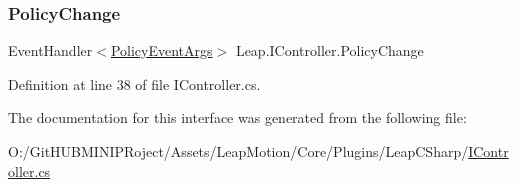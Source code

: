 \mbox{\label{interface_leap_1_1_i_controller_acbcab217190984328912af3babced005}} 
\subsubsection{\texorpdfstring{PolicyChange}{PolicyChange}}
{\footnotesize\ttfamily Event\+Handler$<$\mbox{\hyperlink{class_leap_1_1_policy_event_args}{Policy\+Event\+Args}}$>$ Leap.\+I\+Controller.\+Policy\+Change}



Definition at line 38 of file I\+Controller.\+cs.



The documentation for this interface was generated from the following file\+:\begin{DoxyCompactItemize}
\item 
O\+:/\+Git\+H\+U\+B\+M\+I\+N\+I\+P\+Roject/\+Assets/\+Leap\+Motion/\+Core/\+Plugins/\+Leap\+C\+Sharp/\mbox{\hyperlink{_i_controller_8cs}{I\+Controller.\+cs}}\end{DoxyCompactItemize}
